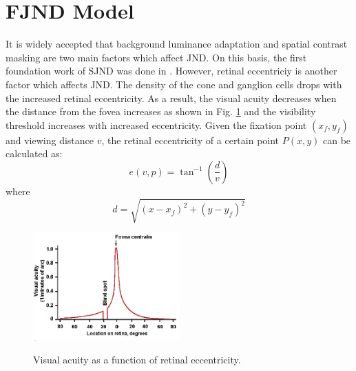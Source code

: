 \documentclass[journal]{IEEEtran}
\begin{document}
\section{FJND Model}
It is widely accepted that background luminance adaptation and spatial contrast masking are two main factors which affect JND. On this basis, the first foundation work of SJND was done in \cite{RN634}. However, retinal eccentriciy is another factor which affects JND. The density of the cone and ganglion cells drops with the increased retinal eccentricity. As a result, the visual acuity decreases when the distance from the fovea increases as shown in Fig. \ref{fig:Visualacuity} and the visibility threshold increases with increased eccentricity. Given the fixation point $\left( x_f,y_f\right)$ and viewing distance $v$, the retinal eccentricity of a certain point $P\left(x,y\right)$ can be calculated as:
\begin{equation}
e\left (  v,p\right )=\tan^{-1}\left ( \frac{d}{v} \right )
\end{equation}
where \begin{equation}
d= \sqrt{\left ( x-x_f \right )^2+\left ( y-y_f \right )^2 }
\end{equation}
\begin{figure}[!t]
	\centering
	\includegraphics[width=0.5\textwidth]{blndspot}\\
	\caption{Visual acuity as a function of retinal eccentricity.}
	\label{fig:Visualacuity}
\end{figure}
\end{document}
